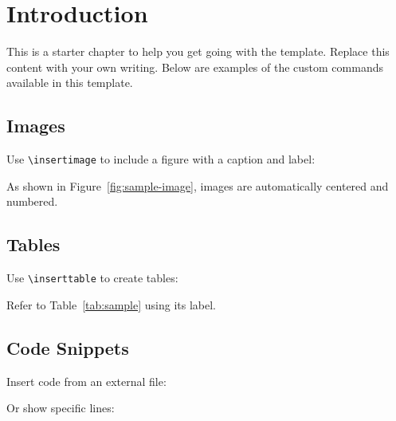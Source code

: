 \chapter{Introduction}
\label{ch:introduction}

This is a starter chapter to help you get going with the template.
Replace this content with your own writing. Below are examples of the
custom commands available in this template.


\section{Images}
\label{sec:images}

Use \verb|\insertimage| to include a figure with a caption and label:


As shown in Figure~\ref{fig:sample-image}, images are automatically centered
and numbered.


\section{Tables}
\label{sec:tables}

Use \verb|\inserttable| to create tables:


Refer to Table~\ref{tab:sample} using its label.


\section{Code Snippets}
\label{sec:code}

Insert code from an external file:


Or show specific lines:



